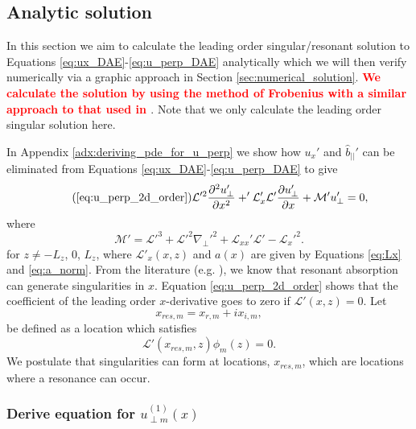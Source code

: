 \documentclass[linenumbers]{aastex63}
\newcommand{\alexedit}[1]{\textcolor{red}{\textbf{#1}}}
\begin{document}
\subsection{Analytic solution}
\label{sec:analytic_soln}

In this section we aim to calculate the leading order singular/resonant solution to Equations \eqref{eq:ux_DAE}-\eqref{eq:u_perp_DAE} analytically which we will then verify numerically via a graphic approach in Section \ref{sec:numerical_solution}. \alexedit{We calculate the solution by using the method of Frobenius with a similar approach to that used in \citet{Thompson1993,Wright1994,Soler2013}}. Note that we only calculate the leading order singular solution here. 

In Appendix \ref{adx:deriving_pde_for_u_perp} we show how $u_x'$ and $\hat{b}_{||}'$ can be eliminated from Equations \eqref{eq:ux_DAE}-\eqref{eq:u_perp_DAE} to give
\begin{equation}
    \tag{\ref{eq:u_perp_2d_order}}
    \mathcal{L}'^2\pdv[2]{u_\perp'}{x}+'\mathcal{L}_x'\mathcal{L}'\pdv{u_\perp'}{x}+\mathcal{M}'u_\perp'=0,
\end{equation}
where
\begin{equation}
    \mathcal{M}' = \mathcal{L}'^3+\mathcal{L}'^2\nabla_\perp'^2+\mathcal{L}_{xx}'\mathcal{L}'-\mathcal{L}_x'^2.
\end{equation}
for $z\ne-L_z$, 0, $L_z$, where $\mathcal{L}'_x(x,z)$ and $a(x)$ are given by Equations \eqref{eq:Lx} and \eqref{eq:a_norm}. 
From the literature (e.g. \citealt{Thompson1993,Wright1996}), we know that resonant absorption can generate singularities in $x$. Equation \eqref{eq:u_perp_2d_order} shows that the coefficient of the leading order $x$-derivative goes to zero if $\mathcal{L}'(x,z)=0$. Let
\[x_{res,m} = x_{r,m} + i x_{i,m},\]
be defined as a location which satisfies
\begin{equation}
    \label{eq:x_res_defn}
    \mathcal{L}'(x_{res,m},z)\phi_m(z)=0.
\end{equation}
We postulate that singularities can form at locations, $x_{res,m}$, which are locations where a resonance can occur.

\subsubsection{Derive equation for \texorpdfstring{$u_{\perp m}^{(1)}(x)$}{uperpm(1)(x)}}
\end{document}
